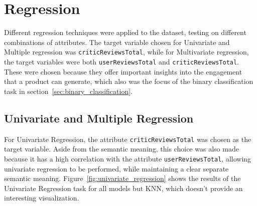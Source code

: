 \chapter{Regression}
\label{ch:capitolo4}
Different regression techniques were applied to the dataset, testing
on different combinations of attributes. The target variable chosen for
Univariate and Multiple regression was \texttt{criticReviewsTotal}, while
for Multivariate regression, the target variables were both
\texttt{userReviewsTotal} and \texttt{criticReviewsTotal}.
These were chosen because they offer important insights into the engagement
that a product can generate, which also was the focus of the binary
classification task in section~\ref{sec:binary_classification}.


\section{Univariate and Multiple Regression}
For Univariate Regression, the attribute
\texttt{criticReviewsTotal} was chosen
as the target variable. Aside from the semantic meaning, this choice was also made
because it has a high correlation
with the attribute \texttt{userReviewsTotal}, allowing univariate regression
to be performed, while maintaining a clear separate semantic meaning.
Figure~\ref{fig:univariate_regression} shows the results of the Univariate Regression task for
all models but KNN, which doesn't provide an interesting visualization.
